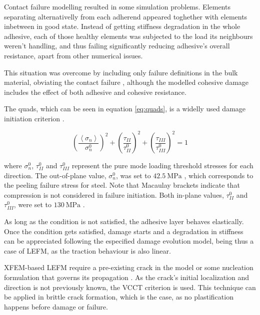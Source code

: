 Contact failure modelling resulted in some simulation problems. Elements separating alternativelly from each adherend appeared toghether with elements inbetween in good state. Instead of getting stiffness degradation in the whole adhesive, each of those healthy elements was subjected to the load its neighbours weren't handling, and thus failing significantly reducing adhesive's overall resistance, apart from other numerical issues.

This situation was overcome by including only failure definitions in the bulk material, obviating the contact failure \citep{Greve2007, Loureiro2010, Sadowski2010, Sadowski2011, Scattina2011, Sadowski2014, SernaMoreno2015}, although the modelled cohesive damage includes the effect of both adhesive and cohesive resistance.

The \gls{quads}, which can be seen in equation \ref{eq:quads}, is a widelly used damage initiation criterion \citep{Greve2007, Loureiro2010, Sadowski2010, Sadowski2011, Scattina2011, Sadowski2014, SernaMoreno2015}.

\begin{equation}
\left(\frac{\left<\sigma_{n}\right>}{\sigma_{n}^{0}}\right)^{2} + \left(\frac{\tau_{II}}{\tau_{II}^{0}}\right)^{2} + \left(\frac{\tau_{III}}{\tau_{III}^{0}}\right)^{2} = 1
\label{eq:quads}
\end{equation}

where $\sigma_{n}^{0}$, $\tau_{II}^{0}$ and $\tau_{III}^{0}$ represent the pure mode loading threshold stresses for each direction. The out-of-plane value, $\sigma_{n}^{0}$, was set to $\SI{42.5}{\MPa}$ \citep{Scattina2011}, which corresponds to the peeling failure stress for steel. Note that Macaulay brackets indicate that compression is not considered in failure initiation. Both in-plane values, $\tau_{II}^{0}$ and $\tau_{III}^{0}$, were set to $\SI{130}{\MPa}$ \citep{Scattina2011}. %

As long as the condition is not satisfied, the adhesive layer behaves elastically. Once the condition gets satisfied, damage starts and a degradation in stiffness can be appreciated following the especified damage evolution model, being thus a case of \gls{LEFM}, as the traction behaviour is also linear.

\gls{XFEM}-based \gls{LEFM} require a pre-existing crack in the model or some nucleation formulation that governs its propagation \citep{Abaqus613Manual}. As the crack's initial localization and direction is not previously known, the \gls{VCCT} criterion is used. This technique can be applied in brittle crack formation, which is the case, as no plastification happens before damage or failure.

